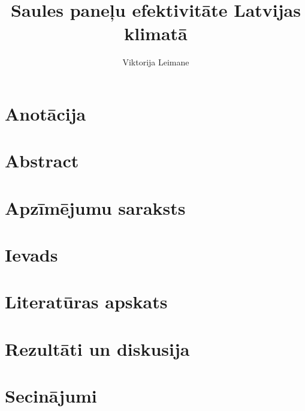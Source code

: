\documentclass[12pt,oneside]{LuThesis}
\title{Saules paneļu efektivitāte Latvijas klimatā}
\author{Viktorija Leimane}
\begin{document}
\maketitle

\chapter*{Anotācija}
\setcounter{page}{1}
\begin{abstract}

\end{abstract}

\chapter*{Abstract}
\begin{english}
\begin{abstract}

\end{abstract}
\end{english}

\tableofcontents

\chapter*{Apzīmējumu saraksts}


\chapter*{Ievads}

% 

\chapter{Literatūras apskats}
% 






\chapter{Rezultāti un diskusija}





\chapter*{Secinājumi}

\end{document}
